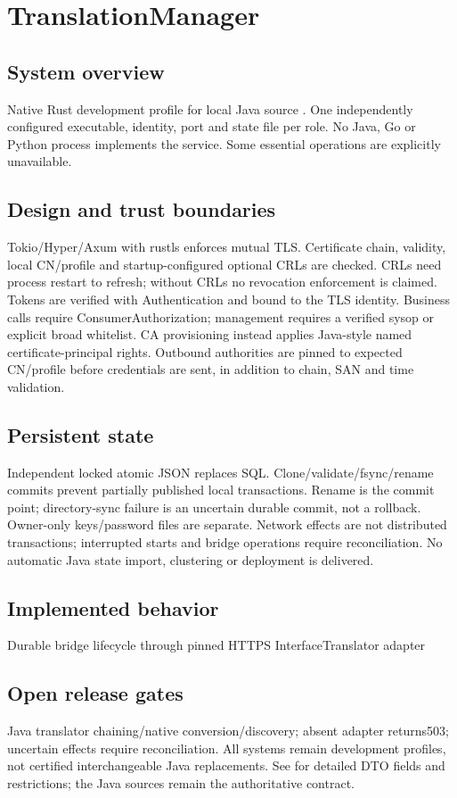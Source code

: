 \documentclass[a4paper]{arrowhead}
\begin{document}
\section{TranslationManager}
\subsection{System overview}
Native Rust development profile for local Java source . One independently configured executable, identity, port and state file per role. No Java, Go or Python process implements the service. Some essential operations are explicitly unavailable.
\subsection{Design and trust boundaries}
Tokio/Hyper/Axum with rustls enforces mutual TLS. Certificate chain, validity, local CN/profile and startup-configured optional CRLs are checked. CRLs need process restart to refresh; without CRLs no revocation enforcement is claimed. Tokens are verified with Authentication and bound to the TLS identity. Business calls require ConsumerAuthorization; management requires a verified sysop or explicit broad whitelist. CA provisioning instead applies Java-style named certificate-principal rights. Outbound authorities are pinned to expected CN/profile before credentials are sent, in addition to chain, SAN and time validation.
\subsection{Persistent state}
Independent locked atomic JSON replaces SQL. Clone/validate/fsync/rename commits prevent partially published local transactions. Rename is the commit point; directory-sync failure is an uncertain durable commit, not a rollback. Owner-only keys/password files are separate. Network effects are not distributed transactions; interrupted starts and bridge operations require reconciliation. No automatic Java state import, clustering or deployment is delivered.
\subsection{Implemented behavior}
Durable bridge lifecycle through pinned HTTPS InterfaceTranslator adapter
\subsection{Open release gates}
Java translator chaining/native conversion/discovery; absent adapter returns503; uncertain effects require reconciliation. All systems remain development profiles, not certified interchangeable Java replacements. See  for detailed DTO fields and restrictions; the Java sources remain the authoritative contract.
\end{document}
